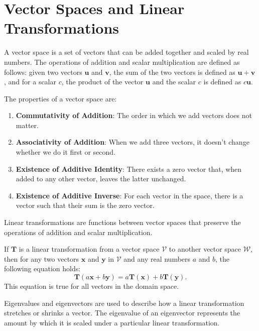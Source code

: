 \documentclass{article} %
\begin{document}

\section*{Vector Spaces and Linear Transformations}

A vector space is a set of vectors that can be added together and scaled by real numbers. The operations of 
addition and scalar multiplication are defined as follows: given two vectors $\mathbf{u}$ and $\mathbf{v}$, the sum of 
the two vectors is defined as $\mathbf{u} + \mathbf{v}$, and for a scalar $c$, the product of the vector 
$\mathbf{u}$ and the scalar $c$ is defined as $c\mathbf{u}$.

The properties of a vector space are:

\begin{enumerate}
    \item \textbf{Commutativity of Addition}: The order in which we add vectors does not matter.
    \item \textbf{Associativity of Addition}: When we add three vectors, it doesn't change whether we do it first or second.
    \item \textbf{Existence of Additive Identity}: There exists a zero vector that, when added to any other vector, leaves the 
    latter unchanged.
    \item \textbf{Existence of Additive Inverse}: For each vector in the space, there is a vector such that their sum is the zero 
    vector.
\end{enumerate}

Linear transformations are functions between vector spaces that preserve the operations of addition and scalar 
multiplication.

If $\mathbf{T}$ is a linear transformation from a vector space $\mathcal{V}$ to another vector space $\mathcal{W}$, then 
for any two vectors $\mathbf{x}$ and $\mathbf{y}$ in $\mathcal{V}$ and any real numbers $a$ and $b$, the following equation holds: 
\[
\mathbf{T}(a\mathbf{x} + b\mathbf{y}) = a\mathbf{T}(\mathbf{x}) + b\mathbf{T}(\mathbf{y}).
\]
This equation is true for all vectors in the domain space.

Eigenvalues and eigenvectors are used to describe how a linear transformation stretches or shrinks a vector. The 
eigenvalue of an eigenvector represents the amount by which it is scaled under a particular linear transformation.
\end{document}
